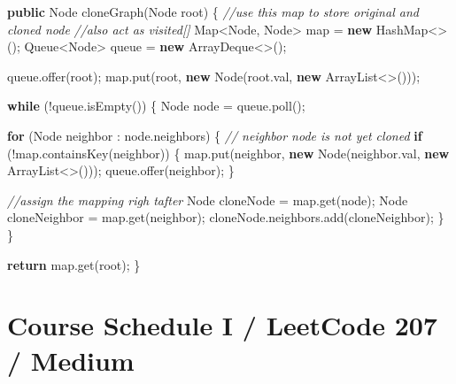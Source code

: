 \documentclass[]{book}
\newenvironment{Shaded}{\begin{snugshade}}{\end{snugshade}}
\newcommand{\BuiltInTok}[1]{#1}
\newcommand{\CommentTok}[1]{\textcolor[rgb]{0.56,0.35,0.01}{\textit{#1}}}
\newcommand{\FunctionTok}[1]{\textcolor[rgb]{0.00,0.00,0.00}{#1}}
\newcommand{\KeywordTok}[1]{\textcolor[rgb]{0.13,0.29,0.53}{\textbf{#1}}}
\newcommand{\NormalTok}[1]{#1}
\begin{document}
\begin{Shaded}
\begin{Highlighting}[]
\KeywordTok{public} \BuiltInTok{Node} \FunctionTok{cloneGraph}\NormalTok{(}\BuiltInTok{Node}\NormalTok{ root) \{}
    \CommentTok{//use this map to store original and cloned node}
    \CommentTok{//also act as visited[]}
    \BuiltInTok{Map}\NormalTok{<}\BuiltInTok{Node}\NormalTok{, }\BuiltInTok{Node}\NormalTok{> map = }\KeywordTok{new} \BuiltInTok{HashMap}\NormalTok{<>();}
    \BuiltInTok{Queue}\NormalTok{<}\BuiltInTok{Node}\NormalTok{> queue = }\KeywordTok{new} \BuiltInTok{ArrayDeque}\NormalTok{<>();}

\NormalTok{    queue.}\FunctionTok{offer}\NormalTok{(root);}
\NormalTok{    map.}\FunctionTok{put}\NormalTok{(root, }\KeywordTok{new} \BuiltInTok{Node}\NormalTok{(root.}\FunctionTok{val}\NormalTok{, }\KeywordTok{new} \BuiltInTok{ArrayList}\NormalTok{<>()));}

    \KeywordTok{while}\NormalTok{ (!queue.}\FunctionTok{isEmpty}\NormalTok{()) \{}
        \BuiltInTok{Node}\NormalTok{ node = queue.}\FunctionTok{poll}\NormalTok{();}

        \KeywordTok{for}\NormalTok{ (}\BuiltInTok{Node}\NormalTok{ neighbor : node.}\FunctionTok{neighbors}\NormalTok{) \{}
            \CommentTok{// neighbor node is not yet cloned}
            \KeywordTok{if}\NormalTok{ (!map.}\FunctionTok{containsKey}\NormalTok{(neighbor)) \{}
\NormalTok{                map.}\FunctionTok{put}\NormalTok{(neighbor, }\KeywordTok{new} \BuiltInTok{Node}\NormalTok{(neighbor.}\FunctionTok{val}\NormalTok{, }\KeywordTok{new} \BuiltInTok{ArrayList}\NormalTok{<>()));}
\NormalTok{                queue.}\FunctionTok{offer}\NormalTok{(neighbor);}
\NormalTok{            \}}

            \CommentTok{//assign the mapping righ tafter}
            \BuiltInTok{Node}\NormalTok{ cloneNode = map.}\FunctionTok{get}\NormalTok{(node);}
            \BuiltInTok{Node}\NormalTok{ cloneNeighbor = map.}\FunctionTok{get}\NormalTok{(neighbor);}
\NormalTok{            cloneNode.}\FunctionTok{neighbors}\NormalTok{.}\FunctionTok{add}\NormalTok{(cloneNeighbor);}
\NormalTok{        \}}
\NormalTok{    \}}

    \KeywordTok{return}\NormalTok{ map.}\FunctionTok{get}\NormalTok{(root);}
\NormalTok{\}}
\end{Highlighting}
\end{Shaded}

\hypertarget{course-schedule-i-leetcode-207-medium}{%
\section{Course Schedule I / LeetCode 207 / Medium}\label{course-schedule-i-leetcode-207-medium}}
\end{document}
